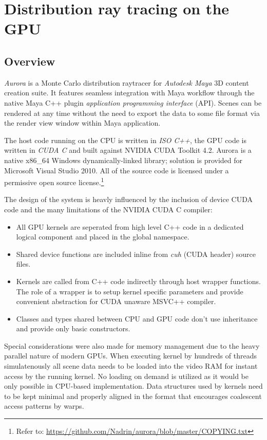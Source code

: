 \chapter{Distribution ray tracing on the GPU}
\label{ch:raytracing}

\section{Overview}
\emph{Aurora} is a Monte Carlo distribution raytracer for \emph{Autodesk Maya} 3D content creation suite. It features seamless integration with Maya workflow through the native Maya C++ plugin \emph{application programming interface} (API). Scenes can be rendered at any time without the need to export the data to some file format via the render view window within Maya application.

The host code running on the CPU is written in \emph{ISO C++}, the GPU code is written in \emph{CUDA C} and built against NVIDIA CUDA Toolkit 4.2. Aurora is a native x86\_64 Windows dynamically-linked library; solution is provided for Microsoft Visual Studio 2010. All of the source code is licensed under a permissive open source license.\footnote{Refer to: \url{https://github.com/Nadrin/aurora/blob/master/COPYING.txt}}

The design of the system is heavly influenced by the inclusion of device CUDA code and the many limitations of the NVIDIA CUDA C compiler:
\begin{itemize}
\item All GPU kernels are seperated from high level C++ code in a dedicated logical component and placed in the global namespace.
\item Shared device functions are included inline from \emph{cuh} (CUDA header) source files.
\item Kernels are called from C++ code indirectly through host wrapper functions. The role of a wrapper is to setup kernel specific parameters and provide convenient abstraction for CUDA unaware MSVC++ compiler.
\item Classes and types shared between CPU and GPU code don't use inheritance and provide only basic constructors.
\end{itemize}
Special considerations were also made for memory management due to the heavy parallel nature of modern GPUs. When executing kernel by hundreds of threads simulatenously all scene data needs to be loaded into the video RAM for instant access by the running kernel. No loading on demand is utilized as it would be only possible in CPU-based implementation. Data structures used by kernels need to be kept minimal and properly aligned in the format that encourages coalescent access patterns by warps.

